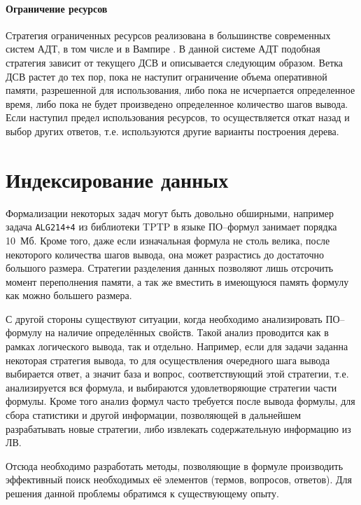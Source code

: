 \paragraph{Ограничение ресурсов} Стратегия ограниченных ресурсов реализована в большинстве современных систем АДТ, в том числе и в Вампире \cite{Ryazanov2003}. В данной системе АДТ подобная стратегия зависит от текущего ДСВ и описывается следующим образом. Ветка ДСВ растет до тех пор, пока не наступит ограничение объема оперативной памяти, разрешенной для использования, либо пока не исчерпается определенное время, либо пока не будет произведено определенное количество шагов вывода. Если наступил предел использования ресурсов, то осуществляется откат назад и выбор других ответов, т.е. используются другие варианты построения дерева.



\section{Индексирование данных}

Формализации некоторых задач могут быть довольно обширными, например задача \texttt{ALG214+4} из библиотеки TPTP в языке ПО--формул занимает порядка 10~Мб. Кроме того, даже если изначальная формула не столь велика, после некоторого количества шагов вывода, она может разрастись до достаточно большого размера. Стратегии разделения данных позволяют лишь отсрочить момент переполнения памяти, а так же вместить в имеющуюся память формулу как можно большего размера.

С другой стороны существуют ситуации, когда необходимо анализировать ПО--формулу на наличие определённых свойств. Такой анализ проводится как в рамках логического вывода, так и отдельно. Например, если для задачи заданна некоторая стратегия вывода, то для осуществления очередного шага вывода выбирается ответ, а значит база и вопрос, соответствующий этой стратегии, т.е. анализируется вся формула, и выбираются удовлетворяющие стратегии части формулы. Кроме того анализ формул часто требуется после вывода формулы, для сбора статистики и другой информации, позволяющей в дальнейшем разрабатывать новые стратегии, либо извлекать содержательную информацию из ЛВ.

Отсюда необходимо разработать методы, позволяющие в формуле производить эффективный поиск необходимых её элементов (термов, вопросов, ответов). Для решения данной проблемы обратимся к существующему опыту.

